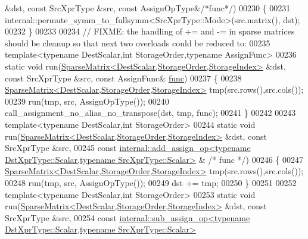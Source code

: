 \begin{DoxyCode}
       &dst, \textcolor{keyword}{const} SrcXprType &src, \textcolor{keyword}{const} AssignOpType&\textcolor{comment}{/*func*/})
00230   \{
00231     internal::permute\_symm\_to\_fullsymm<SrcXprType::Mode>(src.matrix(), dst);
00232   \}
00233 
00234   \textcolor{comment}{// FIXME: the handling of += and -= in sparse matrices should be cleanup so that next two overloads could
       be reduced to:}
00235   \textcolor{keyword}{template}<\textcolor{keyword}{typename} DestScalar,\textcolor{keywordtype}{int} StorageOrder,\textcolor{keyword}{typename} AssignFunc>
00236   \textcolor{keyword}{static} \textcolor{keywordtype}{void} run(\hyperlink{group___sparse_core___module_class_eigen_1_1_sparse_matrix}{SparseMatrix<DestScalar,StorageOrder,StorageIndex>}
       &dst, \textcolor{keyword}{const} SrcXprType &src, \textcolor{keyword}{const} AssignFunc& \hyperlink{structfunc}{func})
00237   \{
00238     \hyperlink{group___sparse_core___module_class_eigen_1_1_sparse_matrix}{SparseMatrix<DestScalar,StorageOrder,StorageIndex>} 
      tmp(src.rows(),src.cols());
00239     run(tmp, src, AssignOpType());
00240     call\_assignment\_no\_alias\_no\_transpose(dst, tmp, func);
00241   \}
00242 
00243   \textcolor{keyword}{template}<\textcolor{keyword}{typename} DestScalar,\textcolor{keywordtype}{int} StorageOrder>
00244   \textcolor{keyword}{static} \textcolor{keywordtype}{void} run(\hyperlink{group___sparse_core___module_class_eigen_1_1_sparse_matrix}{SparseMatrix<DestScalar,StorageOrder,StorageIndex>}
       &dst, \textcolor{keyword}{const} SrcXprType &src,
00245                   \textcolor{keyword}{const} 
      \hyperlink{struct_eigen_1_1internal_1_1add__assign__op}{internal::add\_assign\_op<typename DstXprType::Scalar,typename SrcXprType::Scalar>}
      & \textcolor{comment}{/* func */})
00246   \{
00247     \hyperlink{group___sparse_core___module_class_eigen_1_1_sparse_matrix}{SparseMatrix<DestScalar,StorageOrder,StorageIndex>} 
      tmp(src.rows(),src.cols());
00248     run(tmp, src, AssignOpType());
00249     dst += tmp;
00250   \}
00251 
00252   \textcolor{keyword}{template}<\textcolor{keyword}{typename} DestScalar,\textcolor{keywordtype}{int} StorageOrder>
00253   \textcolor{keyword}{static} \textcolor{keywordtype}{void} run(\hyperlink{group___sparse_core___module_class_eigen_1_1_sparse_matrix}{SparseMatrix<DestScalar,StorageOrder,StorageIndex>}
       &dst, \textcolor{keyword}{const} SrcXprType &src,
00254                   \textcolor{keyword}{const} 
      \hyperlink{struct_eigen_1_1internal_1_1sub__assign__op}{internal::sub\_assign\_op<typename DstXprType::Scalar,typename SrcXprType::Scalar>}

\end{DoxyCode}
